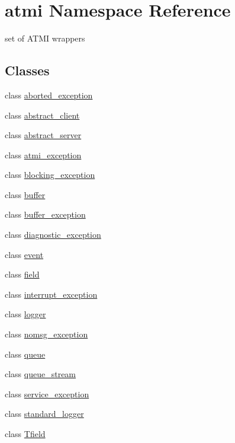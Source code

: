 \hypertarget{namespaceatmi}{}\section{atmi Namespace Reference}
\label{namespaceatmi}


set of A\+T\+M\+I wrappers  


\subsection*{Classes}
\begin{DoxyCompactItemize}
\item 
class \hyperlink{classatmi_1_1aborted__exception}{aborted\+\_\+exception}
\item 
class \hyperlink{classatmi_1_1abstract__client}{abstract\+\_\+client}
\item 
class \hyperlink{classatmi_1_1abstract__server}{abstract\+\_\+server}
\item 
class \hyperlink{classatmi_1_1atmi__exception}{atmi\+\_\+exception}
\item 
class \hyperlink{classatmi_1_1blocking__exception}{blocking\+\_\+exception}
\item 
class \hyperlink{classatmi_1_1buffer}{buffer}
\item 
class \hyperlink{classatmi_1_1buffer__exception}{buffer\+\_\+exception}
\item 
class \hyperlink{classatmi_1_1diagnostic__exception}{diagnostic\+\_\+exception}
\item 
class \hyperlink{classatmi_1_1event}{event}
\item 
class \hyperlink{classatmi_1_1field}{field}
\item 
class \hyperlink{classatmi_1_1interrupt__exception}{interrupt\+\_\+exception}
\item 
class \hyperlink{classatmi_1_1logger}{logger}
\item 
class \hyperlink{classatmi_1_1nomsg__exception}{nomsg\+\_\+exception}
\item 
class \hyperlink{classatmi_1_1queue}{queue}
\item 
class \hyperlink{classatmi_1_1queue__stream}{queue\+\_\+stream}
\item 
class \hyperlink{classatmi_1_1service__exception}{service\+\_\+exception}
\item 
class \hyperlink{classatmi_1_1standard__logger}{standard\+\_\+logger}
\item 
class \hyperlink{classatmi_1_1_tfield}{Tfield}

\end{DoxyCompactItemize}
